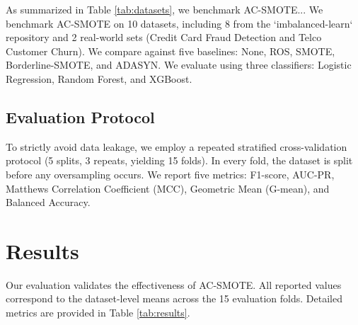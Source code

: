 \documentclass[conference,a4paper]{IEEEtran}
\begin{document}
As summarized in Table \ref{tab:datasets}, we benchmark AC-SMOTE...
We benchmark AC-SMOTE on 10 datasets, including 8 from the `imbalanced-learn` repository and 2 real-world sets (Credit Card Fraud Detection and Telco Customer Churn). We compare against five baselines: None, ROS, SMOTE, Borderline-SMOTE, and ADASYN. We evaluate using three classifiers: Logistic Regression, Random Forest, and XGBoost.

\subsection{Evaluation Protocol}
To strictly avoid data leakage, we employ a repeated stratified cross-validation protocol (5 splits, 3 repeats, yielding 15 folds). In every fold, the dataset is split before any oversampling occurs. We report five metrics: F1-score, AUC-PR, Matthews Correlation Coefficient (MCC), Geometric Mean (G-mean), and Balanced Accuracy.

\section{Results}

Our evaluation validates the effectiveness of AC-SMOTE. All reported values correspond to the dataset-level means across the 15 evaluation folds. Detailed metrics are provided in Table \ref{tab:results}.
\end{document}
